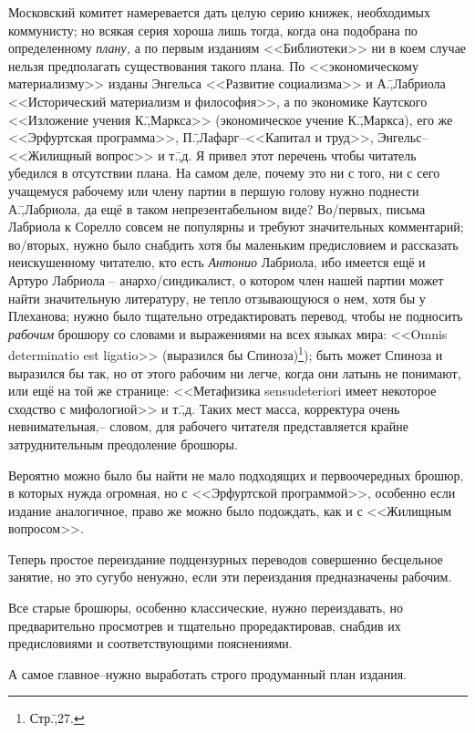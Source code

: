 Московский комитет намеревается дать целую серию книжек, необходимых коммунисту; но всякая серия хороша лишь тогда, когда она подобрана по определенному \emph{плану,} а по первым изданиям <<Библиотеки>> ни в коем случае нельзя предполагать существования такого плана. По <<экономическому материализму>> изданы Энгельса <<Развитие социализма>> и А.\=,Лабриола <<Исторический материализм и философия>>, а по экономике Каутского <<Изложение учения К.\=,Маркса>> (экономическое учение К.\=,Маркса), его же <<Эрфуртская программа>>, П.\=,Лафарг\---<<Капитал и труд>>, Энгельс\---<<Жилищный вопрос>> и т.\=,д. Я привел этот перечень чтобы читатель убедился в отсутствии плана. На самом деле, почему это ни с того, ни с сего учащемуся рабочему или члену партии в першую голову нужно поднести А.\=,Лабриола, да ещё в таком непрезентабельном виде? Во\-/первых, письма Лабриола к Сорелло совсем не популярны и требуют значительных комментарий; во\-/вторых, нужно было снабдить хотя бы маленьким предисловием и рассказать неискушенному читателю, кто есть \emph{Антонио} Лабриола, ибо имеется ещё и Артуро Лабриола \--- анархо\-/синдикалист, о котором член нашей партии может найти значительную литературу, не тепло отзывающуюся о нем, хотя бы у Плеханова; нужно было тщательно отредактировать перевод, чтобы не подносить \emph{рабочим} брошюру со словами и выражениями на всех языках мира: <<Omnis determinatio est ligatio>> (выразился бы Спиноза)\footnote{Стр.\=,27.}); быть может Спиноза и выразился бы так, но от этого рабочим ни легче, когда они латынь не понимают, или ещё на той же странице: <<Метафизика sensudeteriori имеет некоторое сходство с мифологиой>> и т.\=,д. Таких мест масса, корректура очень невнимательная,\--- словом, для рабочего читателя представляется крайне затруднительным преодоление брошюры.

Вероятно можно было бы найти не мало подходящих и первоочередных брошюр, в которых нужда огромная, но с <<Эрфуртской программой>>, особенно если издание аналогичное, право же можно было подождать, как и с <<Жилищным вопросом>>.

Теперь простое переиздание подцензурных переводов совершенно бесцельное занятие, но это сугубо ненужно, если эти переиздания предназначены рабочим.

Все старые брошюры, особенно классические, нужно переиздавать, но предварительно просмотрев и тщательно проредактировав, снабдив их предисловиями и соответствующими пояснениями.

А самое главное\---нужно выработать строго продуманный план издания.

